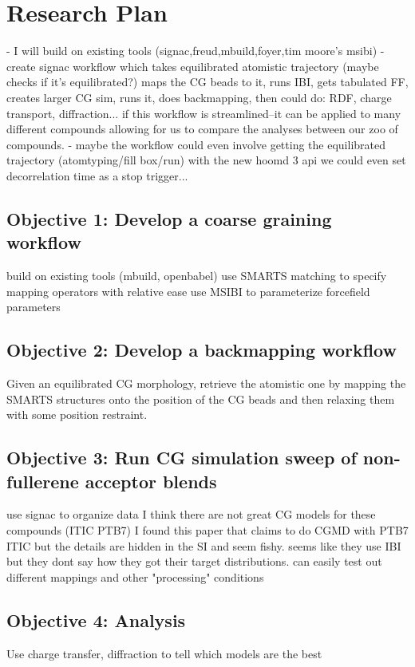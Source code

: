 \section*{Research Plan}
- I will build on existing tools (signac,freud,mbuild,foyer,tim moore's msibi)
- create signac workflow which takes equilibrated atomistic trajectory (maybe checks if it's equilibrated?) maps the CG beads to it, runs IBI, gets tabulated FF, creates larger CG sim, runs it, does backmapping, then could do: RDF, charge transport, diffraction...
if this workflow is streamlined--it can be applied to many different compounds allowing for us to compare the analyses between our zoo of compounds.
- maybe the workflow could even involve getting the equilibrated trajectory (atomtyping/fill box/run) with the new hoomd 3 api we could even set decorrelation time as a stop trigger...
\subsection*{Objective 1: Develop a coarse graining workflow}
build on existing tools (mbuild, openbabel)
use SMARTS matching to specify mapping operators with relative ease
use MSIBI to parameterize forcefield parameters

\subsection*{Objective 2: Develop a backmapping workflow}
Given an equilibrated CG morphology, retrieve the atomistic one by mapping the SMARTS structures onto the position of the CG beads and then relaxing them with some position restraint. 

\subsection*{Objective 3: Run CG simulation sweep of non-fullerene acceptor blends}
use signac to organize data
I think there are not great CG models for these compounds (ITIC PTB7) I found this paper \cite{Meng2019} that claims to do CGMD with PTB7 ITIC but the details are hidden in the SI and seem fishy. seems like they use IBI but they dont say how they got their target distributions.
can easily test out different mappings and other "processing" conditions

\subsection*{Objective 4: Analysis}
Use charge transfer, diffraction to tell which models are the best


